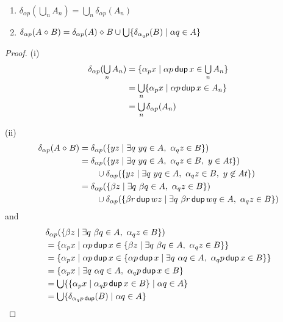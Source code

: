 \documentclass{article}
\newcommand\At{\ensuremath{\mathit{At}}}
\renewcommand\smash{\mathrel{\diamond}}
\newcommand\pdup{\mathop{\mathsf{dup}}}
\newcommand\sbigcup{\mathop{\textstyle\bigcup}}
\begin{document}
\begin{lemma}\ 
\begin{enumerate}
\romanize
\item
$\delta_{\alpha p}(\sbigcup_n A_n) = \sbigcup_n \delta_{\alpha p}(A_n)$
\item
$\delta_{\alpha p}(A\smash B) = \delta_{\alpha p}(A)\smash B \cup \sbigcup \set{\delta_{\alpha_q p}(B)}{\alpha q\in A}$
\end{enumerate}
\end{lemma}

\begin{proof}
(i)
\begin{align*}
\delta_{\alpha p}(\sbigcup_n A_n)
&= \set{\alpha_p x}{\alpha p\pdup x\in\sbigcup_n A_n}\\
&= \sbigcup_n \set{\alpha_p x}{\alpha p\pdup x\in A_n}\\
&= \sbigcup_n \delta_{\alpha p}(A_n)
\end{align*}

(ii)
\begin{align*}
\delta_{\alpha p}(A\smash B)
&= \delta_{\alpha p}(\set{yz}{\exists q\ yq\in A,\ \alpha_qz\in B})\\
&= \delta_{\alpha p}(\set{yz}{\exists q\ yq\in A,\ \alpha_qz\in B,\ y\in\At})\\
&\qquad \cup\delta_{\alpha p}(\set{yz}{\exists q\ yq\in A,\ \alpha_qz\in B,\ y\not\in\At})\\
&= \delta_{\alpha p}(\set{\beta z}{\exists q\ \beta q\in A,\ \alpha_qz\in B})\\
&\qquad \cup\delta_{\alpha p}(\set{\beta r\pdup wz}{\exists q\ \beta r\pdup wq\in A,\ \alpha_qz\in B})
\end{align*}
and
\begin{align*}
& \delta_{\alpha p}(\set{\beta z}{\exists q\ \beta q\in A,\ \alpha_qz\in B})\\
&= \set{\alpha_p x}{\alpha p\pdup x\in\set{\beta z}{\exists q\ \beta q\in A,\ \alpha_qz\in B}}\\
&= \set{\alpha_p x}{\alpha p\pdup x\in\set{\alpha p\pdup x}{\exists q\ \alpha q\in A,\ \alpha_qp\pdup x\in B}}\\
&= \set{\alpha_p x}{\exists q\ \alpha q\in A,\ \alpha_qp\pdup x\in B}\\
&= \sbigcup \set{\set{\alpha_p x}{\alpha_q p\pdup x\in B}}{\alpha q\in A}\\
&= \sbigcup \set{\delta_{\alpha_q p\pdup}(B)}{\alpha q\in A}
\end{align*}


\end{proof}
\end{document}

